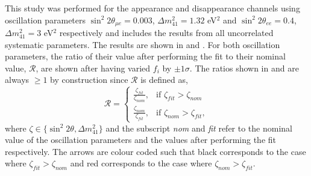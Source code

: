 This study was performed for the \nue appearance and disappearance channels using oscillation parameters $\sin^2{2\theta}_{\mu e} = 0.003$, 
$\Delta m^2_{41} = 1.32$ eV$^2$ and 
$\sin^2{2\theta}_{ee} = 0.4$, $\Delta m^2_{41} = 3$ eV$^2$ respectively and includes the results from all uncorrelated systematic parameters. The results are shown in  and . For both oscillation parameters, the ratio of their value after performing the fit to their nominal value, $\mathcal{R}$, are shown after having varied $f_i$ by $\pm 1 \sigma$. The ratios shown in  and  are always $\geq 1$ by construction since $\mathcal{R}$ is defined as,
\begin{equation}
    \mathcal{R} = \begin{cases}
    \frac{\zeta_{fit}}{\zeta_{nom}}, & \text{if } \zeta_{fit} > \zeta_{nom} \\
    \frac{\zeta_{nom}}{\zeta_{fit}}, &\text{if } \zeta_{nom} > \zeta_{fit},
    \end{cases}
\end{equation}
where $\zeta \in \{\sin^2{2\theta}, \Delta m^2_{41}\}$ and the subscript \textit{nom} and \textit{fit} refer to the nominal value of the oscillation parameters and the values after performing the fit respectively. The arrows are colour coded such that black corresponds to the case where $\zeta_{fit} > \zeta_{nom}$ and red corresponds to the case where $\zeta_{nom} > \zeta_{fit}$.

